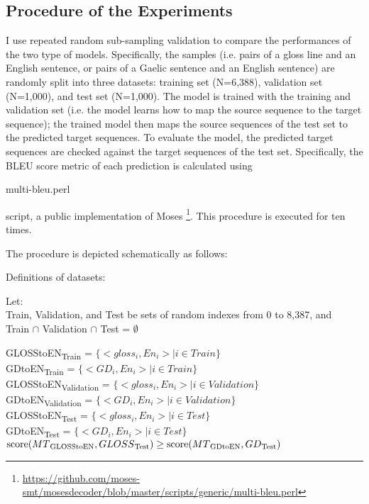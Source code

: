 \documentclass[a4paper]{article}
\begin{document}
\subsection{Procedure of the Experiments}
I use repeated random sub-sampling validation to compare the performances of the two type of models. 
Specifically, the samples (i.e. pairs of a gloss line and an English sentence, or pairs of a Gaelic sentence and an English sentence) are randomly split into three datasets: training set (N=6,388), validation set (N=1,000), and test set (N=1,000). The model is trained with the training and validation set (i.e. the model learns how to map the source sequence to the target sequence); the trained model then maps the source sequences of the test set to the predicted target sequences. To evaluate the model, the predicted target sequences are checked against the target sequences of the test set. Specifically, the BLEU score metric \citep{bleu} of each prediction is calculated using \begin{myfont} multi-bleu.perl \end{myfont} 
script, a public implementation of Moses \citep{moses}\footnote{\url{https://github.com/moses-smt/mosesdecoder/blob/master/scripts/generic/multi-bleu.perl}}.  
This procedure is executed for ten times. 

The procedure is depicted schematically as follows:
\begin{exe}
\ex Definitions of datasets:
\begin{xlist}
\ex Let: \\
    Train, Validation, and Test be sets of random indexes from 0 to 8,387, and \\
    Train $\cap$ Validation $\cap$ Test = $\emptyset$ 

      \begin{xlist}
      \ex \label{GLOSStoENTrain} GLOSStoEN\textsubscript{Train}   = $\{<gloss_i,En_i>  \mid i \in Train \}$ \\
      \ex \label{GDtoENTrain} GDtoEN\textsubscript{Train}   = $\{<GD_i,En_i>  \mid i \in Train \}$ \\
      \ex \label{GLOSStoENVal} GLOSStoEN\textsubscript{Validation}   = $\{<gloss_i,En_i>  \mid i \in Validation \}$ \\
      \ex \label{GDtoENVal} GDtoEN\textsubscript{Validation}   = $\{<GD_i,En_i>  \mid i \in Validation \}$ \\
      \ex \label{GLOSStoENTest}GLOSStoEN\textsubscript{Test} = $\{<gloss_i,En_i>  \mid i \in Test \}$ \\
      \ex \label{GDtoENTest} GDtoEN\textsubscript{Test}    = $\{<GD_i,En_i>  \mid i \in Test \}$ \\
      \ex $\text{score}(MT\textsubscript{GLOSStoEN}, GLOSS\textsubscript{Test}) \geq  \text{score}(MT\textsubscript{GDtoEN}, GD\textsubscript{Test})$
      \end{xlist}
\end{xlist}
\end{exe}
\end{document}

